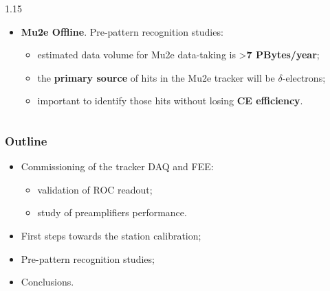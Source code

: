 \documentclass{beamer}
\begin{document}
\begin{frame}
\begin{columns}
\begin{column}{1.15\framewidth}
\begin{itemize}
\begin{itemize}
    \item \textbf{Mu2e Offline}. Pre-pattern recognition studies:
         \vspace{1mm}
    \begin{itemize}
        \item estimated data volume for Mu2e data-taking 
is >\textbf{7 PBytes/year};
     \vspace{1mm}
\item the \textbf{primary source} of hits in the 
Mu2e tracker will be $\delta$-electrons;
     \vspace{1mm}
\item important to identify those hits without losing \textbf{CE efficiency}.
    \end{itemize}
        \end{itemize}
\end{itemize}
 \end{column}
 \end{columns}
     

\end{frame}
\begin{frame}
    \frametitle{Outline}
    
\begin{itemize}
\item Commissioning of the tracker DAQ and FEE:
\begin{itemize}
         \vspace{2mm}

    \item validation of ROC readout;
             \vspace{1.5mm}

    \item \textcolor{mygray}{study of preamplifiers performance}.
\end{itemize}
\vspace{4mm}
    \item \textcolor{mygray}{First steps towards the station calibration;}
    \vspace{6mm}

    \item \textcolor{mygray}{Pre-pattern recognition studies;}
   \vspace{6mm}

    \item \textcolor{mygray}{Conclusions.}
\end{itemize}
\end{frame}
\end{document}
